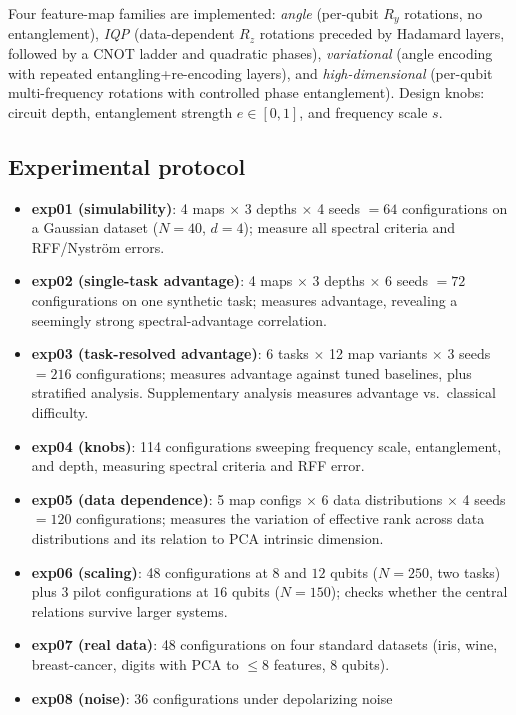 \documentclass[a4paper,unpublished,onecolumn,nopdfoutputerror,12pt]{quantumarticle}
\begin{document}
Four feature-map families are implemented:
\emph{angle} (per-qubit $R_y$ rotations, no entanglement), \emph{IQP} (data-dependent
$R_z$ rotations preceded by Hadamard layers, followed by a CNOT ladder and quadratic
phases), \emph{variational} (angle encoding with repeated entangling+re-encoding layers),
and \emph{high-dimensional} (per-qubit multi-frequency rotations with controlled phase
entanglement). Design knobs: circuit depth, entanglement strength $e\in[0,1]$, and
frequency scale $s$.

\subsection{Experimental protocol}
\label{sec:methods-protocol}

\begin{itemize}
\item \textbf{exp01 (simulability)}: 4 maps $\times$ 3 depths $\times$ 4 seeds $=64$
configurations on a Gaussian dataset ($N=40$, $d=4$); measure all spectral criteria and
RFF/Nystr\"om errors.
\item \textbf{exp02 (single-task advantage)}: 4 maps $\times$ 3 depths $\times$ 6 seeds
$=72$ configurations on one synthetic task; measures advantage, revealing a seemingly
strong spectral-advantage correlation.
\item \textbf{exp03 (task-resolved advantage)}: 6 tasks $\times$ 12 map variants
$\times$ 3 seeds $=216$ configurations; measures advantage against tuned baselines,
plus stratified analysis. Supplementary analysis measures advantage vs.\ classical
difficulty.
\item \textbf{exp04 (knobs)}: 114 configurations sweeping frequency scale, entanglement,
and depth, measuring spectral criteria and RFF error.
\item \textbf{exp05 (data dependence)}: 5 map configs $\times$ 6 data distributions
$\times$ 4 seeds $=120$ configurations; measures the variation of effective rank across
data distributions and its relation to PCA intrinsic dimension.
\item \textbf{exp06 (scaling)}: 48 configurations at $8$ and $12$ qubits ($N=250$,
two tasks) plus 3 pilot configurations at $16$ qubits ($N=150$); checks whether
the central relations survive larger systems.
\item \textbf{exp07 (real data)}: 48 configurations on four standard datasets
(iris, wine, breast-cancer, digits with PCA to $\le8$ features, 8 qubits).
\item \textbf{exp08 (noise)}: 36 configurations under depolarizing noise

\end{itemize}
\end{document}
